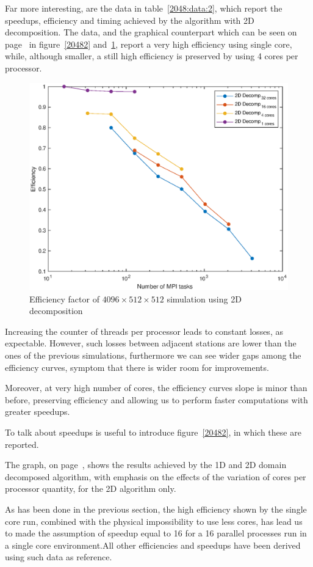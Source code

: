 Far more interesting, are the data in table~\ref{2048:data:2}, which report the speedups, efficiency and timing achieved by the algorithm with 2D decomposition. The data, and the graphical counterpart which can be seen on page~\pageref{20482} in figure~\ref{20482} and~\ref{20484}, report a very high efficiency using single core, while, although smaller, a still high efficiency is preserved by using 4 cores per processor.\\
\par
\begin{figure}
\begin{center}
\includegraphics[scale=0.55]{grafici/20484}
\caption{Efficiency factor of $4096\times512 \times512$ simulation using 2D decomposition}
\label{20484}
\end{center}
\end{figure}
Increasing the counter of threads per processor leads to constant losses, as expectable. However, such losses between adjacent stations are lower than the ones of the previous simulations, furthermore we can see wider gaps among the efficiency curves, symptom that there is wider room for improvements.\par
Moreover, at very high number of cores, the efficiency curves slope is minor than before, preserving efficiency and allowing us to perform faster computations with greater speedups.\\
\par
To talk about speedups is useful to introduce figure~\ref{20482}, in which these are reported.\par
The graph, on page~\pageref{20482}, shows the results achieved by the 1D and 2D domain decomposed algorithm, with emphasis on the effects of the variation of cores per processor quantity, for the 2D algorithm only.\par
As has been done in the previous section, the high efficiency shown by the single core run, combined with the physical impossibility to use less cores, has lead us to made the assumption of speedup equal to 16 for a 16 parallel processes run in a single core environment.All other efficiencies and speedups have been derived using such data as reference.\\
\par

